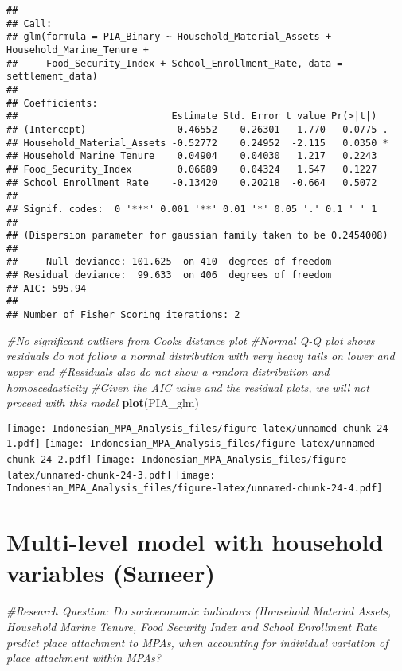 \documentclass[
]{article}
\newenvironment{Shaded}{\begin{snugshade}}{\end{snugshade}}
\newcommand{\CommentTok}[1]{\textcolor[rgb]{0.56,0.35,0.01}{\textit{#1}}}
\newcommand{\FunctionTok}[1]{\textcolor[rgb]{0.13,0.29,0.53}{\textbf{#1}}}
\newcommand{\NormalTok}[1]{#1}
\begin{document}
\begin{verbatim}
## 
## Call:
## glm(formula = PIA_Binary ~ Household_Material_Assets + Household_Marine_Tenure + 
##     Food_Security_Index + School_Enrollment_Rate, data = settlement_data)
## 
## Coefficients:
##                           Estimate Std. Error t value Pr(>|t|)  
## (Intercept)                0.46552    0.26301   1.770   0.0775 .
## Household_Material_Assets -0.52772    0.24952  -2.115   0.0350 *
## Household_Marine_Tenure    0.04904    0.04030   1.217   0.2243  
## Food_Security_Index        0.06689    0.04324   1.547   0.1227  
## School_Enrollment_Rate    -0.13420    0.20218  -0.664   0.5072  
## ---
## Signif. codes:  0 '***' 0.001 '**' 0.01 '*' 0.05 '.' 0.1 ' ' 1
## 
## (Dispersion parameter for gaussian family taken to be 0.2454008)
## 
##     Null deviance: 101.625  on 410  degrees of freedom
## Residual deviance:  99.633  on 406  degrees of freedom
## AIC: 595.94
## 
## Number of Fisher Scoring iterations: 2
\end{verbatim}

\begin{Shaded}
\begin{Highlighting}[]
\CommentTok{\#No significant outliers from Cook\textquotesingle{}s distance plot}
\CommentTok{\#Normal Q{-}Q plot shows residuals do not follow a normal distribution with very heavy tails on lower and upper end}
\CommentTok{\#Residuals also do not show a random distribution and homoscedasticity}
\CommentTok{\#Given the AIC value and the residual plots, we will not proceed with this model}
\FunctionTok{plot}\NormalTok{(PIA\_glm)}
\end{Highlighting}
\end{Shaded}

\texttt{[image: Indonesian\_MPA\_Analysis\_files/figure-latex/unnamed-chunk-24-1.pdf]}
\texttt{[image: Indonesian\_MPA\_Analysis\_files/figure-latex/unnamed-chunk-24-2.pdf]}
\texttt{[image: Indonesian\_MPA\_Analysis\_files/figure-latex/unnamed-chunk-24-3.pdf]}
\texttt{[image: Indonesian\_MPA\_Analysis\_files/figure-latex/unnamed-chunk-24-4.pdf]}

\section{Multi-level model with household variables
(Sameer)}\label{multi-level-model-with-household-variables-sameer}

\begin{Shaded}
\begin{Highlighting}[]
\CommentTok{\#Research Question: Do socioeconomic indicators (Household Material Assets, Household Marine Tenure, Food Security Index and School Enrollment Rate predict place attachment to MPAs, when accounting for individual variation of place attachment within MPAs?}
\end{Highlighting}
\end{Shaded}
\end{document}
